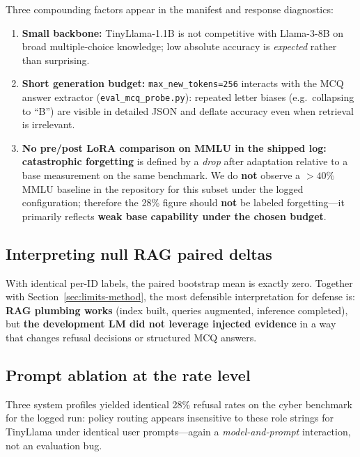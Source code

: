 \documentclass[11pt,a4paper]{article}
\begin{document}
Three compounding factors appear in the manifest and response diagnostics:
\begin{enumerate}[leftmargin=1.5em]
  \item \textbf{Small backbone:} TinyLlama-1.1B is not competitive with Llama-3-8B on broad multiple-choice knowledge; low absolute accuracy is \emph{expected} rather than surprising.
  \item \textbf{Short generation budget:} \texttt{max\_new\_tokens=256} interacts with the MCQ answer extractor (\texttt{eval\_mcq\_probe.py}): repeated letter biases (e.g.\ collapsing to ``B'') are visible in detailed JSON and deflate accuracy even when retrieval is irrelevant.
  \item \textbf{No pre/post LoRA comparison on MMLU in the shipped log:} \textbf{catastrophic forgetting} is defined by a \emph{drop} after adaptation relative to a base measurement on the same benchmark.
  We do \textbf{not} observe a $>40\%$ MMLU baseline in the repository for this subset under the logged configuration; therefore the 28\% figure should \textbf{not} be labeled forgetting---it primarily reflects \textbf{weak base capability under the chosen budget}.
\end{enumerate}

\subsection{Interpreting null RAG paired deltas}

With identical per-ID labels, the paired bootstrap mean is exactly zero.
Together with Section~\ref{sec:limits-method}, the most defensible interpretation for defense is:
\textbf{RAG plumbing works} (index built, queries augmented, inference completed), but \textbf{the development LM did not leverage injected evidence} in a way that changes refusal decisions or structured MCQ answers.

\subsection{Prompt ablation at the rate level}

Three system profiles yielded identical 28\% refusal rates on the cyber benchmark for the logged run: policy routing appears insensitive to these role strings for TinyLlama under identical user prompts---again a \emph{model-and-prompt} interaction, not an evaluation bug.

\end{document}
